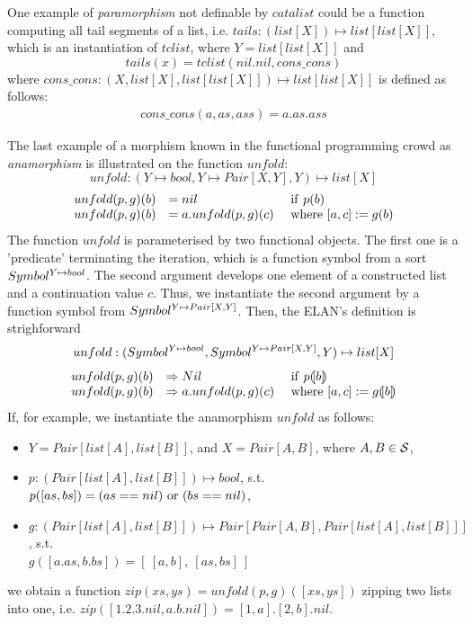\documentclass{article}
\begin{document}
{One example of {\em paramorphism} not definable by $catalist$
could be a function computing all tail segments of a list,
i.e. $tails : (list[X]) \mapsto list[list[X]]$, which is an
instantiation of $tclist$, where $Y = list[list[X]]$ and
\[
   tails(x) = tclist(nil.nil,cons\_cons)
\]
where $cons\_cons : (X, list[X], list[list[X]]) \mapsto list[list[X]]$
is defined as follows:
\[\begin{array}{ll}
  cons\_cons(a,as,ass) = a.as.ass
\end{array}\]

The last example of a morphism known in the functional programming crowd
as {\em anamorphism}%
is illustrated on
the function $unfold$:
\[
  unfold : ( Y \mapsto bool, Y \mapsto Pair[X,Y], Y) \mapsto list[X]
\]
\[\begin{array}{lll}
  unfold(p, g)(b) & = nil                & {\rm ~if~} p(b) \cr
  unfold(p, g)(b) & = a . unfold(p,g)(c) & {\rm ~where~} [a,c]:=g(b) 
\end{array}\]
The function $unfold$ is parameterised by two functional objects.
The first one is a 'predicate' terminating the iteration, which is a 
function symbol from a sort $Symbol^{Y \mapsto bool}$.
The second argument develops one element of a constructed list and 
a continuation value $c$. Thus, we instantiate the second argument
by a function symbol from $Symbol^{Y \mapsto Pair[X,Y]}$.
Then, the ELAN's definition is strighforward
\[
 unfold : ( Symbol^{Y \mapsto bool}, Symbol^{Y \mapsto Pair[X,Y]} , Y) \mapsto list[X]
\]
\[\begin{array}{lll}
  unfold(p, g)(b) & \rewrite Nil                & \IF p \lban b \rban \\
  unfold(p, g)(b) & \rewrite a . unfold(p,g)(c) & \WHERE [a,c]:=g \lban b \rban 
\end{array}\]
%
If, for example, we instantiate the anamorphism $unfold$ as follows:
\begin{itemize}
 \item 
   $Y = Pair[list[A],list[B]]$, and $X = Pair[A,B]$, where $A,B \in {\cal S}$,
 \item
   $ p : ( Pair[list[A],list[B]] ) \mapsto bool$, s.t. \\
   $ p([as,bs]) = (as == nil) {\rm ~or~} (bs == nil) $,
 \item
   $ g : ( Pair[list[A],list[B]] ) \mapsto Pair[Pair[A,B] ,Pair[list[A],list[B]] ] $, s.t.\\
   $ g([a.as, b.bs]) = [~ [a,b],~ [as,bs]~ ] $
\end{itemize}
we obtain a function $zip(xs,ys) = unfold(p,g)([xs,ys])$
zipping two lists into one, i.e.
$zip([1.2.3.nil,a.b.nil]) = [1,a].[2,b].nil$.

}
\end{document}
